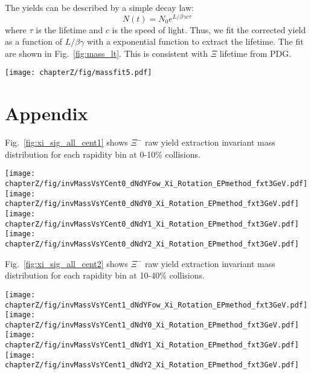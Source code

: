 The yields can be described by a simple decay law:
\begin{equation}
N(t)=N_{0}e^{L/\beta\gamma c\tau}
\end{equation}
where $\tau$ is the lifetime and $c$ is the speed of light. Thus, we fit the corrected yield as a function of $L/\beta\gamma$ with a exponential function to extract the lifetime. The fit are shown in Fig.~\ref{fig:mass_lt}. This is consistent with $\Xi$ lifetime from PDG.
\begin{figure*}[hbt!]
\texttt{[image: chapterZ/fig/massfit5.pdf]}
\caption{Corrected yield as a function of $L/\beta\gamma$ for $\Xi$ at 0-10\%, 10-40\%, 0-40\% centrality.}
\label{fig:mass_lt}
\end{figure*}


\section{Appendix}
\label{sub:apdA}
Fig.~\ref{fig:xi_sig_all_cent1} shows $\Xi^{-}$ raw yield extraction invariant mass distribution for each rapidity bin at 0-10\% collisions.
\begin{figure*}[hbt!]
\texttt{[image: chapterZ/fig/invMassVsYCent0\_dNdYFow\_Xi\_Rotation\_EPmethod\_fxt3GeV.pdf]}
\texttt{[image: chapterZ/fig/invMassVsYCent0\_dNdY0\_Xi\_Rotation\_EPmethod\_fxt3GeV.pdf]}
\texttt{[image: chapterZ/fig/invMassVsYCent0\_dNdY1\_Xi\_Rotation\_EPmethod\_fxt3GeV.pdf]}
\texttt{[image: chapterZ/fig/invMassVsYCent0\_dNdY2\_Xi\_Rotation\_EPmethod\_fxt3GeV.pdf]}
\caption{Signal and background invariant mass distribution for $\Lambda-\pi^{-}$ pairs in different rapidity and $p_{\rm T}$ bins before efficiency correction, for $0-10\%$ collisions.}
\label{fig:xi_sig_all_cent1}
\end{figure*}

Fig.~\ref{fig:xi_sig_all_cent2} shows $\Xi^{-}$ raw yield extraction invariant mass distribution for each rapidity bin at 10-40\% collisions.
\begin{figure*}[hbt!]
\texttt{[image: chapterZ/fig/invMassVsYCent1\_dNdYFow\_Xi\_Rotation\_EPmethod\_fxt3GeV.pdf]}
\texttt{[image: chapterZ/fig/invMassVsYCent1\_dNdY0\_Xi\_Rotation\_EPmethod\_fxt3GeV.pdf]}
\texttt{[image: chapterZ/fig/invMassVsYCent1\_dNdY1\_Xi\_Rotation\_EPmethod\_fxt3GeV.pdf]}
\texttt{[image: chapterZ/fig/invMassVsYCent1\_dNdY2\_Xi\_Rotation\_EPmethod\_fxt3GeV.pdf]}
\caption{Signal and background invariant mass distribution for $\Lambda-\pi^{-}$ pairs in different rapidity and $p_{\rm T}$ bins before efficiency correction, for $10-40\%$ collisions.}
\label{fig:xi_sig_all_cent2}
\end{figure*}
